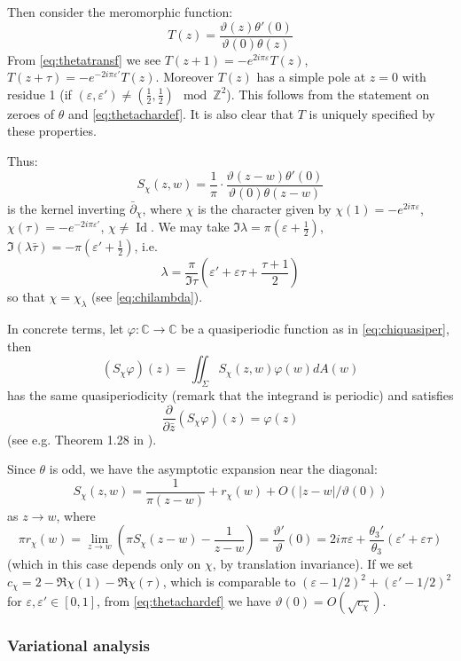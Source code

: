 \documentclass[10pt]{article}
\newcommand{\Z}{\mathbb{Z}}
\newcommand{\C}{\mathbb{C}}
\newcommand{\eps}{\varepsilon}
\newcommand{\dbar}{\bar\partial}
\DeclareMathOperator{\Id}{Id}
\begin{document}
Then consider the meromorphic function:
$$T(z)=\frac{\vartheta(z)\theta'(0)}{\vartheta(0)\theta(z)}$$
From \eqref{eq:thetatransf} we see $T(z+1)=-e^{2i\pi\eps}T(z)$, $T(z+\tau)=-e^{-2i\pi\eps'}T(z)$. Moreover $T(z)$ has a simple pole at $z=0$ with residue 1 (if $(\eps,\eps')\neq(\frac 12,\frac 12)\mod\Z^2$). This follows from the statement on zeroes of $\theta$ and \eqref{eq:thetachardef}. It is also clear that $T$ is uniquely specified by these properties. 

Thus:
\begin{equation}\label{eq:Schi}
S_\chi(z,w)=\frac 1\pi\cdot\frac{\vartheta(z-w)\theta'(0)}{\vartheta(0)\theta(z-w)}
\end{equation}
is the kernel inverting $\dbar_\chi$, where $\chi$ is the character given by $\chi(1)=-e^{2i\pi\eps}$, $\chi(\tau)=-e^{-2i\pi\eps'}$, $\chi\neq\Id$. We may take $\Im\lambda=\pi(\eps+\frac 12)$, $\Im(\lambda\bar\tau)=-\pi(\eps'+\frac 12)$, i.e. 
\begin{equation}\label{eq:lambdachar}
\lambda=\frac\pi {\Im\tau}\left(\eps'+\eps\tau+\frac{\tau+1}2\right)
\end{equation}
so that $\chi=\chi_\lambda$ (see \eqref{eq:chilambda}).

In concrete terms, let $\varphi:\C\rightarrow\C$ be a quasiperiodic function as in \eqref{eq:chiquasiper}, then
$$(S_\chi\varphi)(z)=\iint_\Sigma S_\chi(z,w)\varphi(w)dA(w)$$
has the same quasiperiodicity (remark that the integrand is periodic) and satisfies
$$\frac{\partial}{\partial\bar z}(S_\chi\varphi)(z)=\varphi(z)$$
(see e.g. Theorem 1.28 in \cite{Voisin_Hodge}).

Since $\theta$ is odd, we have the asymptotic expansion near the diagonal:
\begin{equation}\label{eq:Schidiag}
S_\chi(z,w)=\frac{1}{\pi(z-w)}+r_\chi(w)+O(|z-w|/\vartheta(0))
\end{equation}
as $z\rightarrow w$, where
$$\pi r_\chi(w)=\lim_{z\rightarrow w}(\pi S_\chi(z-w)-\frac{1}{z-w})=\frac{\vartheta'}{\vartheta}(0)=2i\pi\eps+\frac{\theta_3'}{\theta_3}(\eps'+\eps\tau)$$
(which in this case depends only on $\chi$, by translation invariance). If we set $c_\chi=2-\Re\chi(1)-\Re\chi(\tau)$, which is comparable to $(\eps-1/2)^2+(\eps'-1/2)^2$ for $\eps,\eps'\in [0,1]$, from \eqref{eq:thetachardef} we have $\vartheta(0)=O(\sqrt {c_\chi})$.


\subsubsection{Variational analysis}\label{ssec:vartorus}
\end{document}
